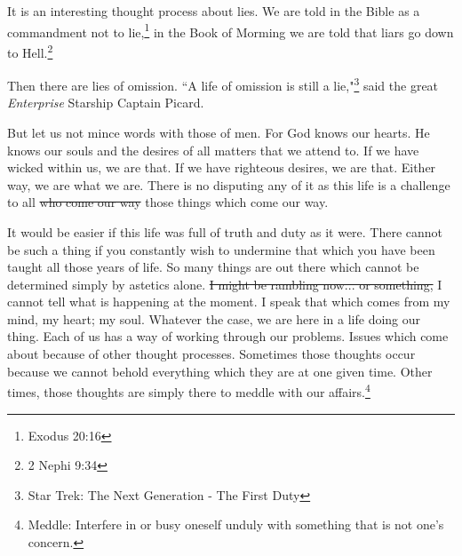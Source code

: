 It is an interesting thought process about lies. We are told in the Bible as a
commandment not to lie,\footnote{Exodus 20:16} in the Book of Morming we are 
told that liars go down to Hell.\footnote{2 Nephi 9:34}

Then there are lies of omission. ``A life of omission is still a 
lie,"\footnote{Star Trek: The Next Generation - The First Duty} said the great 
\textit{Enterprise} Starship Captain Picard.

But let us not mince words with those of men. For God knows our hearts. He knows
our souls and the desires of all matters that we attend to. If we have wicked
within us, we are that. If we have righteous desires, we are that. Either way,
we are what we are. There is no disputing any of it as this life is a challenge
to all \st{who come our way} those things which come our way.

It would be easier if this life was full of truth and duty as it were. There
cannot be such a thing if you constantly wish to undermine that which you have
been taught all those years of life. So many things are out there which cannot
be determined simply by astetics alone. \st{I might be rambling now... or 
something,} I cannot tell what is happening at the moment. I speak that which 
comes from my mind, my heart; my soul. Whatever the case, we are here in a life
doing our thing. Each of us has a way of working through our problems. Issues
which come about because of other thought processes. Sometimes those thoughts
occur because we cannot behold everything which they are at one given time.
Other times, those thoughts are simply there to meddle with our 
affairs.\footnote{Meddle: Interfere in or busy oneself unduly with something
that is not one's concern.}